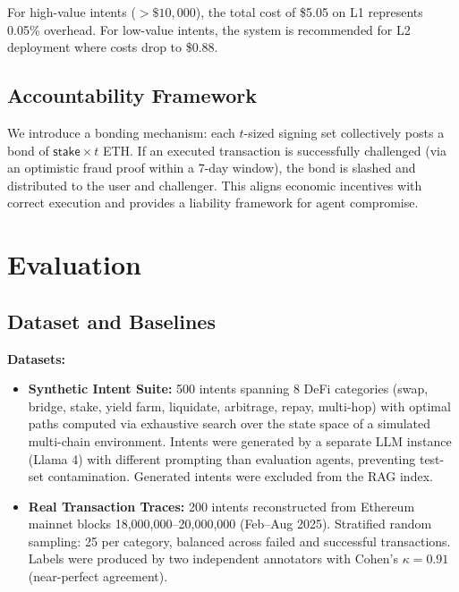 \documentclass[11pt]{article}
\begin{document}
For high-value intents ($>\$10,000$), the total cost of \$5.05 on L1 represents 0.05\% overhead. For low-value intents, the system is recommended for L2 deployment where costs drop to \$0.88.

\subsection{Accountability Framework}

We introduce a bonding mechanism: each $t$-sized signing set collectively posts a bond of $\mathsf{stake} \times t$ ETH. If an executed transaction is successfully challenged (via an optimistic fraud proof within a 7-day window), the bond is slashed and distributed to the user and challenger. This aligns economic incentives with correct execution and provides a liability framework for agent compromise.

\section{Evaluation}
\label{sec:eval}

\subsection{Dataset and Baselines}

\textbf{Datasets:}
\begin{itemize}
  \item \textbf{Synthetic Intent Suite:} 500 intents spanning 8 DeFi categories (swap, bridge, stake, yield farm, liquidate, arbitrage, repay, multi-hop) with optimal paths computed via exhaustive search over the state space of a simulated multi-chain environment. Intents were generated by a separate LLM instance (Llama 4) with different prompting than evaluation agents, preventing test-set contamination. Generated intents were excluded from the RAG index.
  \item \textbf{Real Transaction Traces:} 200 intents reconstructed from Ethereum mainnet blocks 18,000,000--20,000,000 (Feb--Aug 2025). Stratified random sampling: 25 per category, balanced across failed and successful transactions. Labels were produced by two independent annotators with Cohen's $\kappa = 0.91$ (near-perfect agreement).
\end{itemize}
\end{document}
